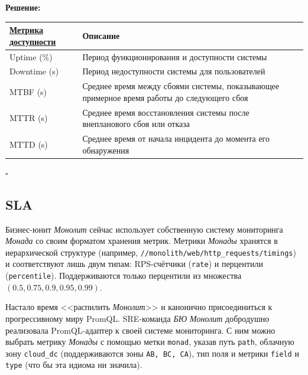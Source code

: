 \documentclass[12pt]{article}
\newenvironment{solution}
{
  \par\textbf{Решение:}\par\bigbreak
  \begingroup
}
{
  \par\bigbreak\hfill$\square$%
  \par\endgroup
}
\begin{document}
\begin{solution}
	\bigbreak
	
	\begin{tabular}{ |p{4cm}|p{11cm}|  } \hline
		\href{https://en.wikipedia.org/wiki/High_availability}{Метрика доступности} & Описание \\ \hline
		Uptime (\%)                                                                                   &                  
        Период функционирования и доступности системы
        \\ \hline
		Downtime (s)                                                                                  &                  
        Период недоступности системы для пользователей
        \\ \hline
		MTBF (s)                                                                                      &                  
        Среднее время между сбоями системы, показывающее примерное время работы до следующего сбоя
        \\ \hline
		MTTR (s)                                                                                      & 
        Среднее время восстановления системы после внепланового сбоя или отказа
        \\ \hline
		MTTD (s)                                                                                      &
        Среднее время от начала инцидента до момента его обнаружения
        \\ \hline
	\end{tabular}
	
\end{solution}

\break
\subsection{SLA}

Бизнес-юнит \textit{Монолит} сейчас использует собственную систему мониторинга \textit{Монада}
со своим форматом хранения метрик. Метрики \textit{Монады} хранятся в иерархической структуре
(например, \texttt{//monolith/web/http\_requests/timings}) и соответствуют лишь двум типам:
RPS-счётчики (\texttt{rate}) и перцентили (\texttt{percentile}). Поддерживаются только перцентили
из множества $(0.5, 0.75, 0.9, 0.95, 0.99)$.

\begin{flushleft}
	Настало время <<распилить \textit{Монолит}>> и канонично присоединиться к прогрессивному миру PromQL.
	SRE-команда \textit{БЮ Монолит} добродушно реализовала PromQL-адаптер к своей системе мониторинга.
	С ним можно выбрать метрику \textit{Монады} с помощью метки \texttt{monad}, указав путь \texttt{path},
	облачную зону \texttt{cloud\_dc} (поддерживаются зоны \texttt{AB, BC, CA}), тип поля и метрики
	\texttt{field} и \texttt{type} (что бы эта идиома ни значила).
\end{flushleft}
\end{document}
